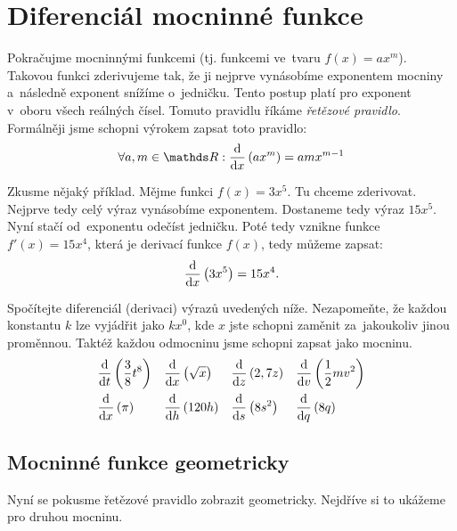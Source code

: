 \section{Diferenciál mocninné funkce}
\label{sec:diferencial-mocninne-funkce}

Pokračujme mocninnými funkcemi (tj. funkcemi ve~tvaru $f(x) = ax^m$). Takovou funkci
zderivujeme tak, že ji nejprve vynásobíme exponentem mocniny a~následně exponent
snížíme o~jedničku. Tento postup platí pro exponent v~oboru všech reálných čísel.
Tomuto pravidlu říkáme \emph{řetězové pravidlo}. Formálněji jsme schopni výrokem
zapsat toto pravidlo:
\begin{equation*}
    \forall a, m \in \reals :
    \fracdiff{}{x} \left(ax^m\right) = amx^{m - 1}
\end{equation*}

Zkusme nějaký příklad. Mějme funkci $f(x) = 3x^5$. Tu chceme zderivovat. Nejprve tedy
celý výraz vynásobíme exponentem. Dostaneme tedy výraz $15x^5$. Nyní stačí
od~exponentu odečíst jedničku. Poté tedy vznikne funkce $f'(x) = 15x^4$, která je
derivací funkce $f(x)$, tedy můžeme zapsat:
\begin{equation*}
    \frac{\mathrm{d}}{\mathrm{d} x} \left( 3x^5 \right) = 15x^4.
\end{equation*}

\begin{exercise}
    Spočítejte diferenciál (derivaci) výrazů uvedených níže. Nezapomeňte, že každou
    konstantu $k$ lze vyjádřit jako $kx^0$, kde $x$ jste schopni zaměnit
    za~jakoukoliv jinou proměnnou. Taktéž každou odmocninu jsme schopni zapsat jako
    mocninu.
    \begin{align*}
        &\frac{\mathrm{d}}{\mathrm{d} t} \left( \frac38 t^8 \right) &
        &\frac{\mathrm{d}}{\mathrm{d} x} \left( \sqrt{x} \right) &
        &\frac{\mathrm{d}}{\mathrm{d} z} \left( 2,7z \right) &
        &\frac{\mathrm{d}}{\mathrm{d} v} \left( \frac12 mv^2 \right) \\
        &\frac{\mathrm{d}}{\mathrm{d} x} \left( \pi \right) &
        &\frac{\mathrm{d}}{\mathrm{d} h} \left( 120h \right) &
        &\frac{\mathrm{d}}{\mathrm{d} s} \left( 8s^2 \right) &
        &\frac{\mathrm{d}}{\mathrm{d} q} \left( 8q \right)
    \end{align*}
\end{exercise}

\subsection{Mocninné funkce geometricky}
\label{subsec:derivace-mocn-fce-geometricky}

Nyní se pokusme řetězové pravidlo zobrazit geometricky. Nejdříve si to ukážeme pro
druhou mocninu.

